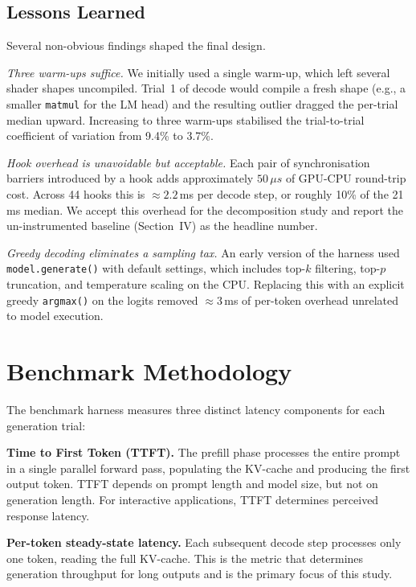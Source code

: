 \documentclass[conference]{IEEEtran}
\begin{document}
\subsection{Lessons Learned}

Several non-obvious findings shaped the final design.

\emph{Three warm-ups suffice.} We initially used a single warm-up,
which left several shader shapes uncompiled. Trial~1 of decode would
compile a fresh shape (e.g., a smaller \texttt{matmul} for the LM head)
and the resulting outlier dragged the per-trial median upward.
Increasing to three warm-ups stabilised the trial-to-trial coefficient
of variation from 9.4\% to 3.7\%.

\emph{Hook overhead is unavoidable but acceptable.} Each pair of
synchronisation barriers introduced by a hook adds approximately
$50\,\mu s$ of GPU-CPU round-trip cost. Across 44 hooks this is
${\approx}2.2$\,ms per decode step, or roughly 10\% of the 21\,ms
median. We accept this overhead for the decomposition study and report
the un-instrumented baseline (Section~IV) as the headline number.

\emph{Greedy decoding eliminates a sampling tax.} An early version of
the harness used \texttt{model.generate()} with default settings, which
includes top-$k$ filtering, top-$p$ truncation, and temperature scaling
on the CPU. Replacing this with an explicit greedy
\texttt{argmax()} on the logits removed ${\approx}3$\,ms of per-token
overhead unrelated to model execution.

\section{Benchmark Methodology}

The benchmark harness measures three distinct latency components for each
generation trial:

\textbf{Time to First Token (TTFT).} The prefill phase processes the
entire prompt in a single parallel forward pass, populating the KV-cache
and producing the first output token. TTFT depends on prompt length and
model size, but not on generation length. For interactive applications,
TTFT determines perceived response latency.

\textbf{Per-token steady-state latency.} Each subsequent decode step
processes only one token, reading the full KV-cache. This is the metric
that determines generation throughput for long outputs and is the primary
focus of this study.
\end{document}
